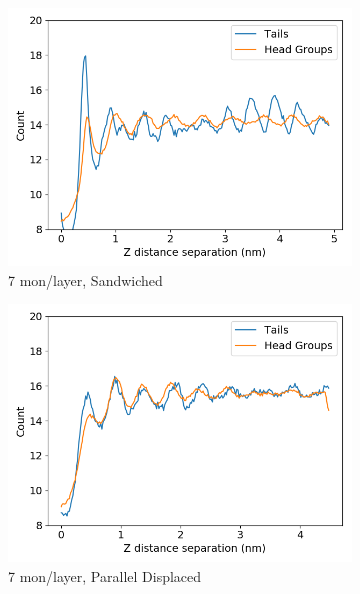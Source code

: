 \documentclass{article}
\begin{document}
\begin{figure}
\begin{subfigure}{0.40\textwidth}
                \includegraphics[width=\textwidth]{zdf_layered_7.png}
                \caption{7 mon/layer, Sandwiched}\label{fig:zdf_layered_7}
        \end{subfigure}
        \begin{subfigure}{0.40\textwidth}
                \centering
                \includegraphics[width=\textwidth]{zdf_offset_7.png}
                \caption{7 mon/layer, Parallel Displaced}\label{fig:zdf_layered_7}
        \end{subfigure}
	\begin{subfigure}{0.40\textwidth}
                \centering

\end{subfigure}
\end{figure}
\end{document}
